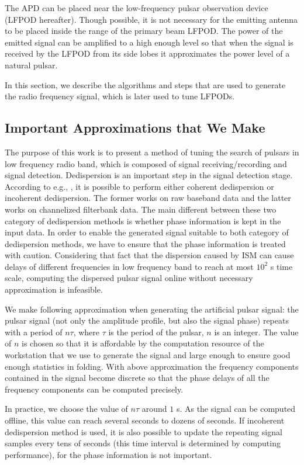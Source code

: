 \documentclass[fleqn,usenatbib]{mnras}
\begin{document}
The APD can be placed near the low-frequency pulsar observation device (LFPOD hereafter). 
Though possible, it is not necessary for the emitting antenna to be placed inside the range of the primary beam LFPOD.
The power of the emitted signal can be amplified to a high enough level so that when the signal is received by the LFPOD from its side lobes it approximates the power level of a natural pulsar.

In this section, we describe the algorithms and steps that are used to generate the radio frequency signal, which is later used to tune LFPODs.

\subsection{Important Approximations that We Make}
The purpose of this work is to present a method of tuning the search of pulsars in low frequency radio band, which is composed of signal receiving/recording and signal detection.
Dedispersion is an important step in the signal detection stage.
According to e.g., \citet{2012hpa..book.....L}, it is possible to perform either coherent dedispersion or incoherent dedispersion. The former works on raw baseband data and the latter works on channelized filterbank data. 
The main different between these two category of dedispersion methods is whether phase information is kept in the input data.
In order to enable the generated signal suitable to both category of dedispersion methods, we have to ensure that the phase information is treated with caution.
Considering that fact that the dispersion caused by ISM can cause delays of different frequencies in low frequency band to reach at most $10^2$ s time scale, computing the dispersed pulsar signal online without necessary approximation is infeasible.

We make following approximation when generating the artificial pulsar signal: the pulsar signal (not only the amplitude profile, but also the signal phase) repeats with a period of $n\tau$, where $\tau$ is the period of the pulsar, $n$ is an integer. The value of $n$ is chosen so that it is affordable by the computation resource of the workstation that we use to generate the signal and large enough to ensure good enough statistics in folding. 
With above approximation the frequency components contained in the signal become discrete so that the phase delays of all the frequency components can be computed precisely.

In practice, we choose the value of $n\tau$ around $1$ s.
As the signal can be computed offline, this value can reach several seconds to dozens of seconds.
If incoherent dedispersion method is used, it is also possible to update the repeating signal samples every tens of seconds (this time interval is determined by computing performance), for the phase information is not important. 
\end{document}
